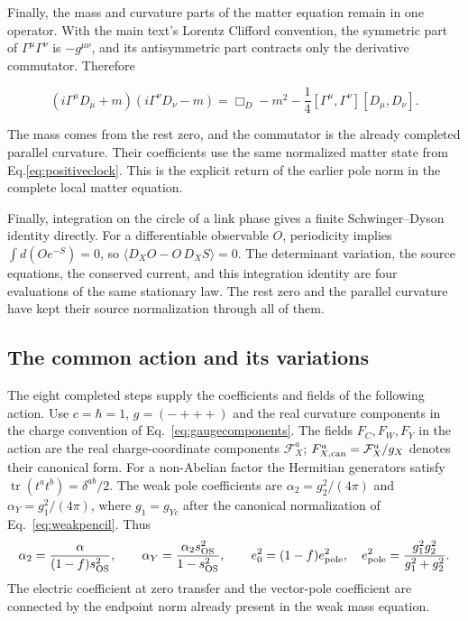 \documentclass[aps,prx,onecolumn,10pt,notitlepage,nofootinbib,longbibliography]{revtex4-2}
\numberwithin{equation}{section}
\numberwithin{table}{section}
\newcommand{\tr}{\operatorname{tr}}
\begin{document}
Finally, the mass and curvature parts of the matter equation remain in one operator. With the main text's Lorentz Clifford convention, the symmetric part of \(\Gamma^\mu\Gamma^\nu\) is \(-g^{\mu\nu}\), and its antisymmetric part contracts only the derivative commutator. Therefore

\begin{equation}
 (i\Gamma^\mu D_\mu+m)(i\Gamma^\nu D_\nu-m)
  =\Box_D-m^2-\frac14[\Gamma^\mu,\Gamma^\nu][D_\mu,D_\nu].
 \label{eq:proof-SF-6}
\end{equation}

The mass comes from the rest zero, and the commutator is the already completed parallel curvature. Their coefficients use the same normalized matter state from Eq.\eqref{eq:positiveclock}. This is the explicit return of the earlier pole norm in the complete local matter equation.

Finally, integration on the circle of a link phase gives a finite Schwinger--Dyson identity directly. For a differentiable observable \(O\), periodicity implies \(\int d(Oe^{-S})=0\), so \(\langle D_XO-O\,D_XS\rangle=0\). The determinant variation, the source equations, the conserved current, and this integration identity are four evaluations of the same stationary law. The rest zero and the parallel curvature have kept their source normalization through all of them.
\subsection{The common action and its variations}
\label{sec:commonaction}

The eight completed steps supply the coefficients and fields of the
following action. Use $c=\hbar=1$, $g=(-+++)$ and the real curvature
components in the charge convention of Eq.~\eqref{eq:gaugecomponents}.
The fields $F_C,F_W,F_Y$ in the action are the real charge-coordinate components $\mathcal F_X^a$; $F_{X,{\rm can}}^a=\mathcal F_X^a/g_X$ denotes their canonical form. For a non-Abelian factor the Hermitian generators satisfy
$\tr(t^at^b)=\delta^{ab}/2$.
The weak pole coefficients are
$\alpha_2=g_2^2/(4\pi)$ and $\alpha_Y=g_1^2/(4\pi)$, where
$g_1=g_{Yc}$ after the canonical normalization of
Eq.~\eqref{eq:weakpencil}. Thus
\begin{equation}
 \alpha_2=\frac{\alpha}{(1-f)s_{\rm OS}^2},\qquad
 \alpha_Y=\frac{\alpha_2s_{\rm OS}^2}{1-s_{\rm OS}^2},\qquad
 e_0^2=(1-f)e_{\rm pole}^2,
 \quad e_{\rm pole}^2=\frac{g_1^2g_2^2}{g_1^2+g_2^2}.
 \label{eq:actionpolecoefficients}
\end{equation}
The electric coefficient at zero transfer and the vector-pole coefficient
are connected by the endpoint norm already present in the weak mass
equation.
\end{document}
